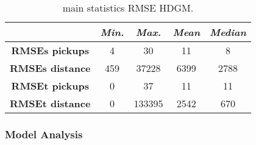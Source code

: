 \begin{table}[h!]
	\centering
	\renewcommand\arraystretch{1.3}
	\begin{tabular}{c|c|c|c|c|}
		\hline
		\textit{} & \textit{Min.} & \textit{Max.} & \textit{Mean} & \textit{Median} \\
		\hline
		\textbf{RMSEs pickups} & 4 & 30 & 11 & 8 \\
		\hline
		\textbf{RMSEs distance} & 459 & 37228 & 6399 & 2788 \\
		\hline
		\textbf{RMSEt pickups} & 0 & 37 & 11 & 11 \\
		\hline
		\textbf{RMSEt distance} & 0 & 133395 & 2542 & 670\\
		\hline
	\end{tabular}
	\caption{main statistics RMSE HDGM.}
	\label{RMSE_HDGM_stats}
\end{table}
\subsubsection{Model Analysis} 
